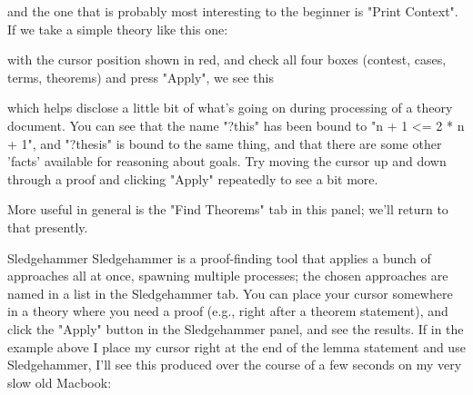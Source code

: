 and the one that is probably most interesting to the beginner is "Print Context". If we take a simple theory like this one:

with the cursor position shown in red, and check all four boxes (contest, cases, terms, theorems) and press "Apply", we see this

which helps disclose a little bit of what's going on during processing of a theory document. You can see that the name "?this" has been bound to "n + 1 <= 2 * n + 1", and "?thesis" is bound to the same thing, and that there are some other 'facts' available for reasoning about goals. Try moving the cursor up and down through a proof and clicking "Apply" repeatedly to see a bit more. 

More useful in general is the "Find Theorems" tab in this panel; we'll return to that presently. 

Sledgehammer
Sledgehammer is a proof-finding tool that applies a bunch of approaches all at once, spawning multiple processes; the chosen approaches are named in a list in the Sledgehammer tab. You can place your cursor somewhere in a theory where you need a proof (e.g., right after a theorem statement), and click the "Apply" button in the Sledgehammer panel, and see the results. If in the example above I place my cursor right at the end of the lemma statement and use Sledgehammer, I'll see this produced over the course of a few seconds on my very slow old Macbook:


